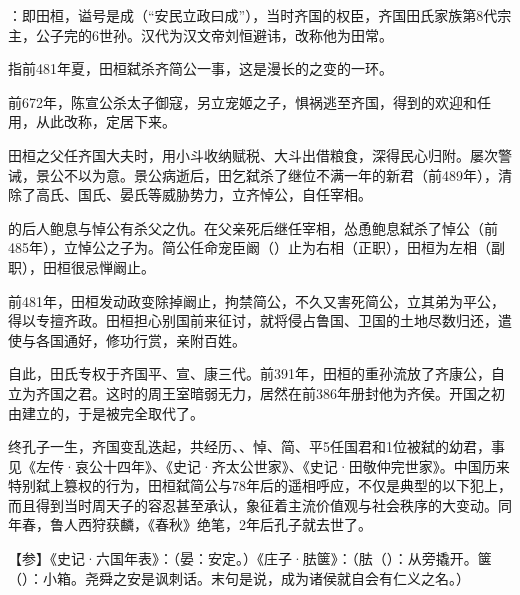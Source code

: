 {
\item {}：即田桓，谥号是成（“安民立政曰成”），当时齐国的权臣，齐国田氏家族第8代宗主，公子完的6世孙。汉代为汉文帝刘恒避讳，改称他为田常。

指前481年夏，田桓弑杀齐简公一事，这是漫长的之变的一环。
\begin{lyenumerate}
\item 前672年，陈宣公杀太子御寇，另立宠姬之子，惧祸逃至齐国，得到的欢迎和任用，从此改称，定居下来。
\item 田桓之父任齐国大夫时，用小斗收纳赋税、大斗出借粮食，深得民心归附。屡次警诫，景公不以为意。景公病逝后，田乞弑杀了继位不满一年的新君（前489年），清除了高氏、国氏、晏氏等威胁势力，立齐悼公，自任宰相。
\item {}的后人鲍息与悼公有杀父之仇。在父亲死后继任宰相，怂恿鲍息弑杀了悼公（前485年），立悼公之子为。简公任命宠臣阚（）止为右相（正职），田桓为左相（副职），田桓很忌惮阚止。
\item 前481年，田桓发动政变除掉阚止，拘禁简公，不久又害死简公，立其弟为平公，得以专擅齐政。田桓担心别国前来征讨，就将侵占鲁国、卫国的土地尽数归还，遣使与各国通好，修功行赏，亲附百姓。
\item 自此，田氏专权于齐国平、宣、康三代。前391年，田桓的重孙流放了齐康公，自立为齐国之君。这时的周王室暗弱无力，居然在前386年册封他为齐侯。开国之初由建立的，于是被完全取代了。
\end{lyenumerate}
终孔子一生，齐国变乱迭起，共经历、、悼、简、平5任国君和1位被弑的幼君，事见《左传·哀公十四年》、《史记·齐太公世家》、《史记·田敬仲完世家》。中国历来特别弑上篡权的行为，田桓弑简公与78年后的遥相呼应，不仅是典型的以下犯上，而且得到当时周天子的容忍甚至承认，象征着主流价值观与社会秩序的大变动。同年春，鲁人西狩获麟，《春秋》绝笔，2年后孔子就去世了。%

【参】《史记·六国年表》：（晏：安定。）《庄子·胠箧》：（胠（）：从旁撬开。箧（）：小箱。尧舜之安是讽刺话。末句是说，成为诸侯就自会有仁义之名。）

}

